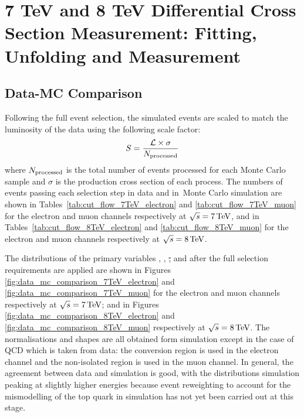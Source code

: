 \chapter{7 TeV and 8 TeV Differential Cross Section Measurement: Fitting, Unfolding and Measurement}
\label{c:Differential_Cross_Section:fitting_and_unfolding}


\section{Data-MC Comparison}
\label{ss:data-mc_comparison}
Following the full event selection, the simulated events are scaled to match the luminosity of the data using
the following scale factor:
\begin{equation}
  S = \frac{{\cal L} \times  \sigma}{N_{\rm processed}}
\end{equation}
where $N_{\rm processed}$ is the total number of events processed for each Monte Carlo sample and $\sigma$ is
the production cross section of each process. The numbers of events passing each selection step in data and
in Monte Carlo simulation are shown in Tables~\ref{tab:cut_flow_7TeV_electron} and
\ref{tab:cut_flow_7TeV_muon} for the electron and muon channels respectively at $\sqrt{s}=7\,\text{Te\hspace{-.08em}V}$, and in
Tables~\ref{tab:cut_flow_8TeV_electron} and \ref{tab:cut_flow_8TeV_muon} for the electron and muon channels
respectively at $\sqrt{s}=8\,\text{Te\hspace{-.08em}V}$.






The distributions of the primary variables \met, \HT, \st, \wpt and \mt after the full selection requirements
are applied are shown in Figures \ref{fig:data_mc_comparison_7TeV_electron} and
\ref{fig:data_mc_comparison_7TeV_muon} for the electron and muon channels respectively at $\sqrt{s}=7\,\text{Te\hspace{-.08em}V}$;
and in Figures \ref{fig:data_mc_comparison_8TeV_electron} and \ref{fig:data_mc_comparison_8TeV_muon}
respectively at $\sqrt{s}=8\,\text{Te\hspace{-.08em}V}$. The normalisations and shapes are all obtained form simulation except in the
case of QCD which is taken from data: the conversion region is used in the electron channel and the
non-isolated region is used in the muon channel. In general, the agreement between data and simulation is
good, with the distributions simulation peaking at slightly higher energies because event reweighting to
account for the \pt mismodelling of the top quark in simulation has not yet been carried out at this stage.

